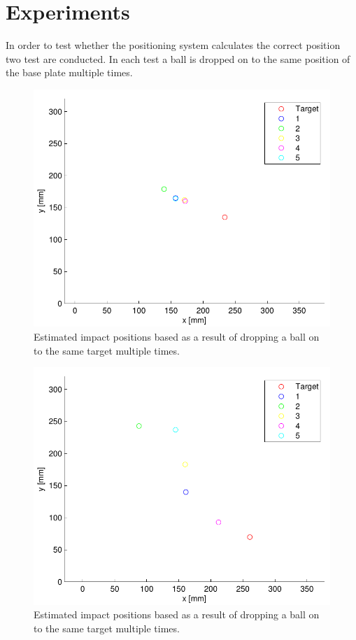 \chapter{Experiments} %
\label{chap:experiments}

In order to test whether the positioning system calculates the correct position two test are conducted.
In each test a ball is dropped on to the same position of the base plate multiple times.

\begin{figure}[htb]
	\centering
	\includegraphics[width=.8\textwidth]{figures/testRes30deg.pdf}
	\caption{Estimated impact positions based as a result of dropping a ball on to the same target multiple times.}
	\label{fig:testRes30deg}
\end{figure}

\begin{figure}[htb]
	\centering
	\includegraphics[width=.8\textwidth]{figures/testRes15deg.pdf}
	\caption{Estimated impact positions based as a result of dropping a ball on to the same target multiple times.}
	\label{fig:testRes15deg}
\end{figure}

